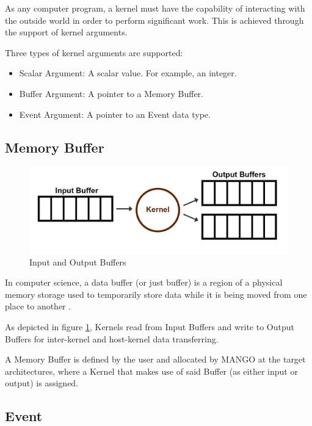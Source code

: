 As any computer program, a kernel must have the capability of interacting with the outside world in order to perform significant work. This is achieved through the support of kernel arguments.

Three types of kernel arguments are supported: 
\begin{itemize}
    \item Scalar Argument: A scalar value. For example, an integer.
    \item Buffer Argument: A pointer to a Memory Buffer.
    \item Event Argument: A pointer to an Event data type.
\end{itemize}

\subsection{Memory Buffer}

\begin{figure}[ht]
    \centering
    \includegraphics[width=\textwidth]{img/kernel-buffer.png}
    \captionsetup{justification=centering}
    \caption{Input and Output Buffers}
    \label{fig:in_out_buffers}
\end{figure}

In computer science, a data buffer (or just buffer) is a region of a physical memory storage used to temporarily store data while it is being moved from one place to another \cite{buffer_wikipedia}.

As depicted in figure \ref{fig:in_out_buffers}, Kernels read from Input Buffers and write to Output Buffers for inter-kernel and host-kernel data transferring.

A Memory Buffer is defined by the user and allocated by MANGO at the target architectures, where a Kernel that makes use of said Buffer (as either input or output) is assigned.

\subsection{Event}

